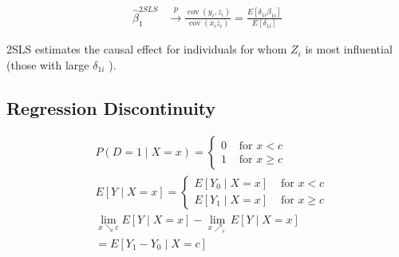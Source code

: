 \begin{align*}
    \widehat{\beta}_1^{2 S L S} &\stackrel{p}{\longrightarrow} \frac{\operatorname{cov}\left(y_i, z_i\right)}{\operatorname{cov}\left(x_i z_i\right)}=\frac{E\left[\delta_{1 i} \beta_{1 i}\right]}{E\left[\delta_{1 i}\right]}
\end{align*}

2SLS estimates the causal effect for individuals for whom $Z_i$ is most influential (those with large $\delta_{1 i}$ ).

\subsection{Regression Discontinuity}

\begin{align*}
    & P(D=1 \mid X=x)= \begin{cases}0 & \text { for } x<c \\
    1 & \text { for } x \geq c\end{cases} \\
    & E[Y \mid X=x]= \begin{cases}E\left[Y_0 \mid X=x\right] & \text { for } x<c \\
    E\left[Y_1 \mid X=x\right] & \text { for } x \geq c\end{cases} \\
    & \lim _{x \searrow c} E[Y \mid X=x]-\lim _{x \nearrow_c} E[Y \mid X=x] \\
    & =E\left[Y_1-Y_0 \mid X=c\right]
\end{align*}